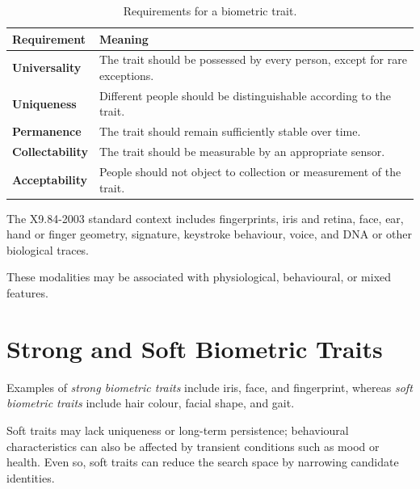 \documentclass[11pt,a4paper,oneside]{report}
\begin{document}
\begin{table}[htbp]
\centering
\caption{Requirements for a biometric trait.}
\label{tab:trait-requirements}
\small

\begin{tabular}{
    >{\bfseries}P{3.0cm}
    P{10.8cm}
}
\toprule

Requirement &
\textbf{Meaning}
\\

\midrule

Universality &
The trait should be possessed by every person, except for rare exceptions.
\\

Uniqueness &
Different people should be distinguishable according to the trait.
\\

Permanence &
The trait should remain sufficiently stable over time.
\\

Collectability &
The trait should be measurable by an appropriate sensor.
\\

Acceptability &
People should not object to collection or measurement of the trait.
\\

\bottomrule
\end{tabular}

\end{table}

The X9.84-2003 standard context includes fingerprints, iris and retina, face, ear, hand or finger geometry, signature, keystroke behaviour, voice, and DNA or other biological traces.

These modalities may be associated with physiological, behavioural,
or mixed features.

\section{Strong and Soft Biometric Traits}
\label{subsec:strong-soft}

Examples of \emph{strong biometric traits} include iris, face, and fingerprint, whereas \emph{soft biometric traits} include hair colour, facial shape, and gait.

Soft traits may lack uniqueness or long-term persistence; behavioural
characteristics can also be affected by transient conditions such as mood or
health. Even so, soft traits can reduce the search space by narrowing candidate
identities.
\end{document}
